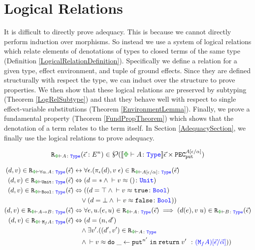 \section{Logical Relations}
It is difficult to directly prove adequacy. This is because we cannot directly perform induction over morphisms. So instead we use a system of logical relations which relate elements of denotations of types to closed terms of the same type (Definition \ref{LogicalRelationDefinition}). Specifically we define a relation for a given type, effect environment, and tuple of ground effects. Since they are defined structurally with respect the type, we can induct over the structure to prove properties. We then show that these logical relations are preserved by subtyping (Theorem \ref{LogRelSubtype}) and that they behave well with respect to single effect-variable substitutions (Theorem \ref{EnvironmentLemma}). Finally, we prove a fundamental property (Theorem \ref{FundPropTheorem}) which shows that the denotation of a term relates to the term itself. In Section \ref{AdequacySection}, we finally use the logical relations to prove adequacy.

\begin{framed}
    \begin{definition}\label{LogicalRelationDefinition}
        \begin{equation}
            \label{LogicalRelationType}
            \erelates{\P}{A}(\ev: E^n) \in \powset{\deno{\wellformedt{\P}{A}}\ev\times \pecput^{A\ssub{\a}{\e}}}
        \end{equation}
   
        \begin{align*}
                    (d, v)\in\erelates{\P}{\all{\a}{A}}(\ev) & \leftrightarrow \forall\e. (\pe(d), \eapp{v}{\e})\in\erelates{\P}{A\ssub{\a}{\e}}(\ev)\\
                    (d, v)\in\erelates{\P}{\U}(\ev) & \Leftrightarrow (d=\singleton \wedge \zberelation{v}{()}{\U})
                    \\
                    (d, v)\in\erelates{\P}{\B}(\ev) & \Leftrightarrow ((d=\top \wedge \zberelation{v}{\t}{\B}) 
                    \\& \quad\vee (d=\bot \wedge \zberelation{v}{\f}{\B}))
                    \\
                    (d, v)\in\erelates{\P}{\ab}(\ev)  &\Leftrightarrow \forall e, u. (e, u)\in\erelates{\P}{A}(\ev) \implies (d(e), \apply{v}{u})\in \erelates{\P}{B}(\ev)
                    \\
                    (d, v)\in\erelates{\P}{\M{f}{A}}(\ev) &\Leftrightarrow (d= (n, d')
                    \\ & \quad\wedge \exists v'. ((d', v')\in\erelates{\P}{A}
                    \\ & \quad\wedge  \zberelation{v}{\doin{\_}{\put^{n'}}{\return{v'}}}{(\M{f}{A})\ssub{\av}{\ev}}))
        \end{align*}
    \end{definition}
        
\end{framed}

